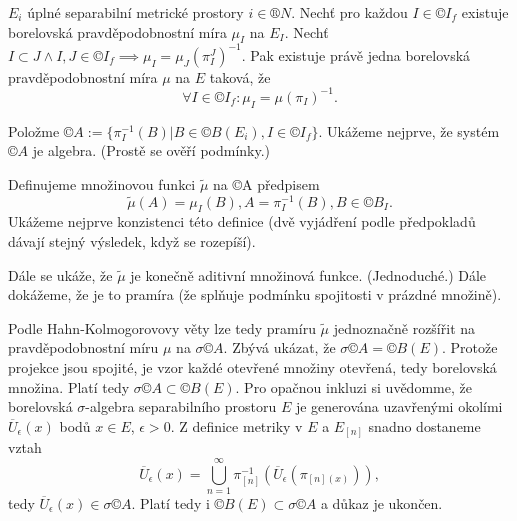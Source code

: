 \documentclass[12pt]{article}					%
\begin{document}
\begin{veta}
	$E_i$ úplné separabilní metrické prostory $i \in ®N$. Nechť pro každou $I \in ©I_f$ existuje borelovská pravděpodobnostní míra $\mu_I$ na $E_I$. Nechť $I \subset J \land I, J \in ©I_f \implies \mu_I = \mu_J(\pi_I^J)^{-1}$. Pak existuje právě jedna borelovská pravděpodobnostní míra $\mu$ na $E$ taková, že
	$$ \forall I \in ©I_f: \mu_I = \mu(\pi_I)^{-1}. $$

	\begin{dukazin}
		Položme $©A := \{\pi_I^{-1}(B) | B \in ©B(E_i), I \in ©I_f\}$. Ukážeme nejprve, že systém $©A$ je algebra. (Prostě se ověří podmínky.)

		Definujeme množinovou funkci $\tilde \mu$ na ©A předpisem
		$$ \tilde \mu(A) = \mu_I(B), A = \pi_I^{-1}(B), B \in ©B_I. $$
		Ukážeme nejprve konzistenci této definice (dvě vyjádření podle předpokladů dávají stejný výsledek, když se rozepíší).

		Dále se ukáže, že $\tilde \mu$ je konečně aditivní množinová funkce. (Jednoduché.) Dále dokážeme, že je to pramíra (že splňuje podmínku spojitosti v prázdné množině).

		Podle Hahn-Kolmogorovovy věty lze tedy pramíru $\tilde \mu$ jednoznačně rozšířit na pravděpodobnostní míru $\mu$ na $\sigma ©A$. Zbývá ukázat, že $\sigma ©A = ©B(E)$. Protože projekce jsou spojité, je vzor každé otevřené množiny otevřená, tedy borelovská množina. Platí tedy $\sigma ©A \subset ©B(E)$. Pro opačnou inkluzi si uvědomme, že borelovská $\sigma$-algebra separabilního prostoru $E$ je generována uzavřenými okolími $\overline{U}_\epsilon(x)$ bodů $x \in E$, $\epsilon >0$. Z definice metriky v $E$ a $E_{[n]}$ snadno dostaneme vztah
		$$ \overline{U}_\epsilon(x) = \bigcup_{n=1}^∞ \pi_{[n]}^{-1}(\overline{U}_\epsilon(\pi_{[n](x)})), $$
		tedy $\overline{U}_\epsilon(x) \in \sigma ©A$. Platí tedy i $©B(E) \subset \sigma ©A$ a důkaz je ukončen.


	\end{dukazin}
\end{veta}
\end{document}
